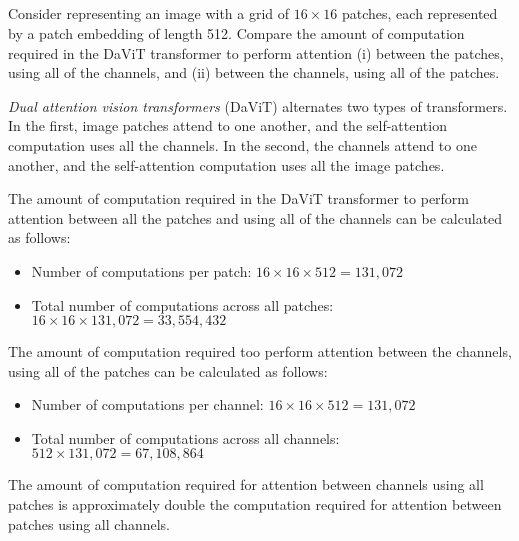 \documentclass[12pt]{report}
\begin{document}
\newpage
\subsection{}
\begin{mdframed}
    Consider representing an image with a grid of $16 \times 16$ patches, each represented by a patch embedding of length 512. Compare the amount of computation required in the DaViT transformer to perform attention (i) between the patches, using all of the channels, and (ii) between the channels, using all of the patches.
\end{mdframed}

\textit{Dual attention vision transformers} (DaViT) alternates two types of transformers. In the first, image patches attend to one another, and the self-attention computation uses all the channels. In the second, the channels attend to one another, and the self-attention computation uses all the image patches.

The amount of computation required in the DaViT transformer to perform attention between all the patches and using all of the channels can be calculated as follows:

\begin{itemize}
    \item Number of computations per patch: $16 \times 16 \times 512 = 131,072$
    \item Total number of computations across all patches: $16 \times 16 \times 131,072 = 33,554,432$
\end{itemize}

The amount of computation required too perform attention between the channels, using all of the patches can be calculated as follows:

\begin{itemize}
    \item Number of computations per channel: $16 \times 16 \times 512 = 131,072$
    \item Total number of computations across all channels: $512 \times 131,072 = 67,108,864$
\end{itemize}

The amount of computation required for attention between channels using all patches is approximately double the computation required for attention between patches using all channels.
\end{document}
